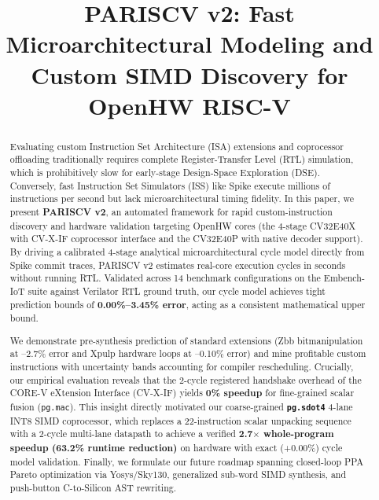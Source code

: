 \documentclass[conference]{IEEEtran}
\begin{document}
\title{PARISCV v2: Fast Microarchitectural Modeling and Custom SIMD Discovery for OpenHW RISC-V}

\author{
\and
{}
\and
{}
}

\maketitle

\begin{abstract}
Evaluating custom Instruction Set Architecture (ISA) extensions and coprocessor offloading traditionally requires complete Register-Transfer Level (RTL) simulation, which is prohibitively slow for early-stage Design-Space Exploration (DSE). Conversely, fast Instruction Set Simulators (ISS) like Spike execute millions of instructions per second but lack microarchitectural timing fidelity. In this paper, we present \textbf{PARISCV v2}, an automated framework for rapid custom-instruction discovery and hardware validation targeting OpenHW cores (the 4-stage CV32E40X with CV-X-IF coprocessor interface and the CV32E40P with native decoder support). By driving a calibrated 4-stage analytical microarchitectural cycle model directly from Spike commit traces, PARISCV v2 estimates real-core execution cycles in seconds without running RTL. Validated across 14 benchmark configurations on the Embench-IoT suite against Verilator RTL ground truth, our cycle model achieves tight prediction bounds of \textbf{0.00\%--3.45\% error}, acting as a consistent mathematical upper bound. 

We demonstrate pre-synthesis prediction of standard extensions (Zbb bitmanipulation at --2.7\% error and Xpulp hardware loops at --0.10\% error) and mine profitable custom instructions with uncertainty bands accounting for compiler rescheduling. Crucially, our empirical evaluation reveals that the 2-cycle registered handshake overhead of the CORE-V eXtension Interface (CV-X-IF) yields \textbf{0\% speedup} for fine-grained scalar fusion (\texttt{pg.mac}). This insight directly motivated our coarse-grained \textbf{\texttt{pg.sdot4}} 4-lane INT8 SIMD coprocessor, which replaces a 22-instruction scalar unpacking sequence with a 2-cycle multi-lane datapath to achieve a verified \textbf{2.7$\times$ whole-program speedup (63.2\% runtime reduction)} on hardware with exact (+0.00\%) cycle model validation. Finally, we formulate our future roadmap spanning closed-loop PPA Pareto optimization via Yosys/Sky130, generalized sub-word SIMD synthesis, and push-button C-to-Silicon AST rewriting.
\end{abstract}
\end{document}

